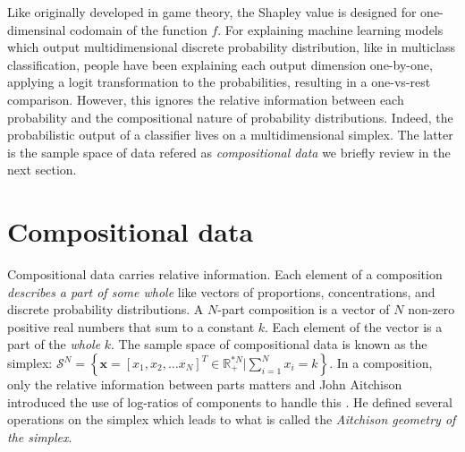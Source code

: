 \documentclass{article}
\theoremstyle{plain}
\theoremstyle{definition}
\theoremstyle{remark}
\begin{document}
Like originally developed in game theory, the Shapley value is designed for one-dimensinal codomain of the function $f$. For explaining machine learning models which output multidimensional discrete probability distribution, like in multiclass classification, people have been explaining each output dimension one-by-one, applying a logit transformation to the probabilities, resulting in a one-vs-rest comparison. However, this ignores the relative information between each probability and the compositional nature of probability distributions. Indeed, the probabilistic output of a classifier lives on a multidimensional simplex. The latter is the sample space of data refered as \emph{compositional data} we briefly review in the next section.

\section{Compositional data}

Compositional data carries relative information. Each element of a composition \emph{describes a part of some whole} \cite{pawlowskymodeling} like vectors of proportions, concentrations, and discrete probability distributions. A $N$-part composition is a vector of $N$ non-zero positive real numbers that sum to a constant $k$. Each element of the vector is a part of the \emph{whole} $k$. The sample space of compositional data is known as the simplex: $\mathcal{S}^N = \left\{ \bm{x} = [x_1, x_2,\dots x_{N}]^T \in \mathbb{R}^{*N}_{+} \big| \sum_{i=1}^{N} x_i = k \right\}$. In a composition, only the relative information between parts matters and John Aitchison introduced the use of log-ratios of components to handle this \cite{aitchison1982}. He defined several operations on the simplex which leads to what is called the \emph{Aitchison geometry of the simplex}.
\end{document}
